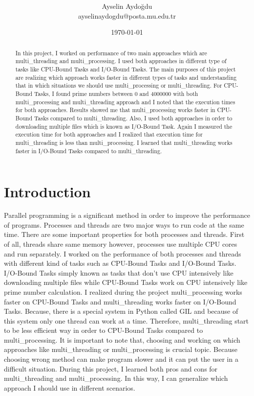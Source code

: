 \documentclass[onecolumn]{article}
\title{\spacecaps{Assignment Report 1: Process and Thread Implementation}\\ \normalsize \spacesc{OS 2034, Operating Systems} }
\author{Ayselin Aydoğdu\\ayselinaydogdu@posta.mu.edu.tr}
\date{\today}
\begin{document}
\maketitle


\begin{abstract}
In this project, I worked on performance of two main approaches which are multi\_threading and multi\_processing. I used both approaches in different type of tasks like CPU-Bound Tasks and I/O-Bound Tasks. The main purposes of this project are realizing which approach works faster in different types of tasks and understanding that in which situations we should use multi\_processing or multi\_threading. For CPU-Bound Tasks, I found prime numbers between 0 and 4000000 with both multi\_processing and multi\_threading approach and I noted that the execution times for both approaches. Results showed me that multi\_processing works faster in CPU-Bound Tasks compared to multi\_threading. Also, I used both approaches in order to downloading multiple files which is known as I/O-Bound Task. Again I measured the execution time for both approaches and I realized that execution time for multi\_threading is less than multi\_processing. I learned that multi\_threading works faster in I/O-Bound Tasks compared to multi\_threading. 
\end{abstract}


\section{Introduction}
Parallel programming is a significant method in order to improve the performance of programs. Processes and threads are two major ways to run code at the same time. There are some important properties for both processes and threads. First of all, threads share same memory however, processes use multiple CPU cores and run separately. I worked on the performance of both processes and threads with different kind of tasks such as CPU-Bound Tasks and I/O-Bound Tasks. I/O-Bound Tasks simply known as tasks that don't use CPU intensively like downloading multiple files while CPU-Bound Tasks work on CPU intensively like prime number calculation. I realized during the project multi\_processing works faster on CPU-Bound Tasks and multi\_threading works faster on I/O-Bound Tasks. Because, there is a special system in Python called GIL and because of this system only one thread can work at a time. Therefore, multi\_threading start to be less efficient way in order to CPU-Bound Tasks compared to multi\_processing. It is important to note that, choosing and working on which approaches like multi\_threading or multi\_processing is crucial topic. Because choosing wrong method can make program slower and it can put the user in a difficult situation. During this project, I learned both pros and cons for multi\_threading and multi\_processing. In this way, I can generalize which approach I should use in different scenarios. 
\end{document}

